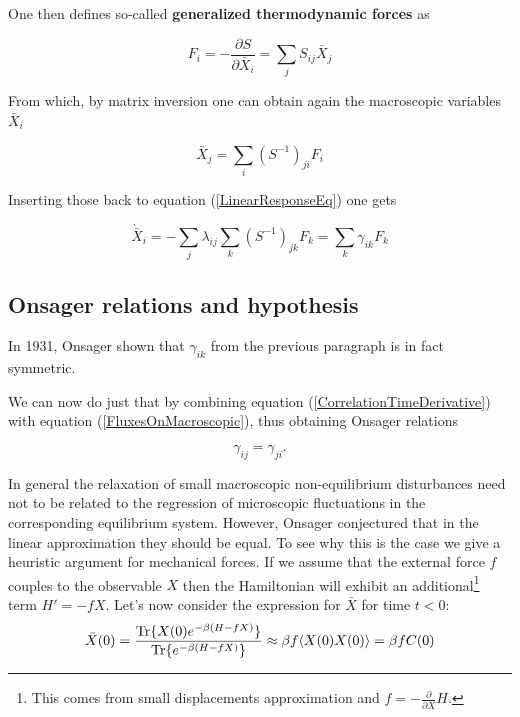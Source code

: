 \documentclass[a4paper,12pt]{article}
\begin{document}
One then defines so-called \textbf{generalized thermodynamic forces} as

\begin{equation}
  F_i= -\frac{\partial{S}}{\partial{\bar{X}_i}}= \sum_j S_{ij}\bar{X}_j
\end{equation}

From which, by matrix inversion one can obtain again the macroscopic variables $\bar{X}_i$

\begin{equation}
  \bar{X}_j = \sum_i (S^{-1})_{ji} F_i
\end{equation}


Inserting those back to equation (\ref{LinearResponseEq}) one gets

\begin{equation}
\label{FluxesOnMacroscopic}
  \dot{\bar{X}}_i=-\sum_j \lambda_{ij} \sum_k (S^{-1})_{jk} F_k = \sum_k \gamma_{ik} F_k
\end{equation}

\subsection{Onsager relations and hypothesis}

In 1931, Onsager\cite{Onsager:zgWBDrcO} shown  that $\gamma_{ik}$ from the previous paragraph is in fact symmetric.

We can now do just that by combining equation (\ref{CorrelationTimeDerivative}) with equation (\ref{FluxesOnMacroscopic}), thus obtaining Onsager relations

\begin{equation}
  \gamma_{ij}=\gamma_{ji}.
\end{equation}

In general the relaxation of small macroscopic non-equilibrium disturbances need not to be related to the regression of microscopic fluctuations in the corresponding equilibrium system. 
However, Onsager conjectured that in the linear approximation they should be equal. To see why this is the case we give a heuristic argument for mechanical forces.
If we assume that the external force $f$ couples to the observable $X$ then the Hamiltonian will exhibit an additional\footnote{This comes from small displacements approximation and $f=-\frac{\partial}{\partial{X}} H$.} term $H'=-f X$.
Let's now consider the expression for $\bar{X}$ for time $t < 0$:
\begin{equation}
  \bar{X}(0)=\frac{\Tr\{ X(0) e^{-\beta (H-f X)} \}}{\Tr\{ e^{-\beta (H-f X)} \}} \approx \beta f \langle X(0)X(0) \rangle= \beta f C(0)
\end{equation}
\end{document}
